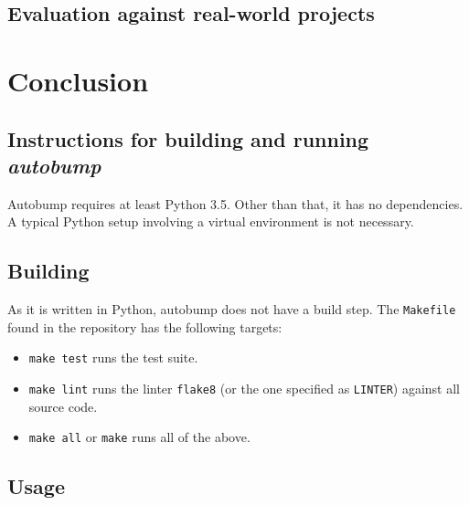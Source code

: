 \documentclass{l4proj}
\begin{document}

\section{Evaluation against real-world projects}


\chapter{Conclusion}

\begin{appendices}

\chapter{Instructions for building and running \textit{autobump}}

Autobump requires at least Python 3.5. Other than that, it has no
dependencies. A typical Python setup involving a virtual environment
is not necessary.

\section{Building}

As it is written in Python, autobump does not have a build step. The
\texttt{Makefile} found in the repository has the following targets:

\begin{itemize}
\item \texttt{make test} runs the test suite.
\item \texttt{make lint} runs the linter \texttt{flake8} (or the one
specified as \texttt{LINTER}) against all source code.
\item \texttt{make all} or \texttt{make} runs all of the above.
\end{itemize}

\section{Usage}

\end{appendices}



\end{document}
